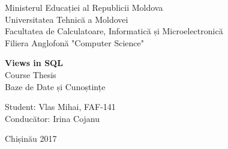 \begin{titlepage}

\newcommand{\HRule}{\rule{\linewidth}{0.5mm}} %

\center

Ministerul Educației al Republicii Moldova\\ %
Universitatea Tehnică a Moldovei \\%
Facultatea de Calculatoare, Informatică și Microelectronică\\
Filiera Anglofonă "Computer Science"\\


\vspace{6cm}

\begin{center}
\LARGE \textbf{Views in SQL}\\
\vspace{0.6cm}
Course Thesis\\
\vspace{0.6cm}
Baze de Date și Cunoștințe
\end{center}
\vspace{4cm}


\hfill Student: Vlas Mihai, FAF-141\\
\vspace{0.2cm}
\hfill Conducător: Irina Cojanu\\
\vspace{0.2cm}





\vfill %
\begin{center}
Chișinău 2017
\end{center}


\end{titlepage}


